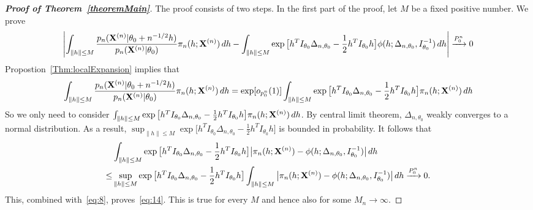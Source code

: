 \documentclass[11pt]{article}
\theoremstyle{plain}
\theoremstyle{definition}
\theoremstyle{remark}
\begin{document}
\begin{appendices}
\begin{proof}[\textbf{Proof of Theorem~\ref{theoremMain}}]
The proof consists of two steps. In the first part of the proof, let  $M$ be a fixed positive number. We prove
\begin{equation}\label{eq:14}
    \left|\int_{\|h\|\leq M} \frac{p_n(\mathbf{X}^{(n)}|\theta_0+n^{-1/2}h)}{p_n(\mathbf{X}^{(n)}|\theta_0)}\pi_n (h;\mathbf{X}^{(n)}) \, dh-\int_{\|h\|\leq M} \exp\big[h^T I_{\theta_0}\Delta_{n,\theta_0}-\frac{1}{2}h^T I_{\theta_0}h\big] \phi(h;\Delta_{n,\theta_0},I_{\theta_0}^{-1})\, dh\right|
 \xrightarrow{P^n_0}0
\end{equation}
Propostion~\ref{Thm:localExpansion} implies that
\begin{equation}\label{eq:8}
    \int_{\|h\|\leq M} \frac{p_n(\mathbf{X}^{(n)}|\theta_0+n^{-1/2}h)}{p_n(\mathbf{X}^{(n)}|\theta_0)}\pi_n (h;\mathbf{X}^{(n)}) \, dh=
    \exp [o_{p^n_0}(1)]\int_{\|h\|\leq M} \exp\big[h^T I_{\theta_0}\Delta_{n,\theta_0}-\frac{1}{2}h^T I_{\theta_0}h\big]\pi_n (h;\mathbf{X}^{(n)}) \, dh
\end{equation}
    So we only need to consider $\int_{\|h\|\leq M} \exp\big[h^T I_{\theta_0}\Delta_{n,\theta_0}-\frac{1}{2}h^T I_{\theta_0}h\big]\pi_n (h;\mathbf{X}^{(n)}) \, dh$.
    By central limit theorem, $\Delta_{n,\theta_0}$ weakly converges to a normal distribution.
    As a result, $\sup_{\|h\|\leq M}\exp\big[h^T I_{\theta_0}\Delta_{n,\theta_0}-\frac{1}{2}h^T I_{\theta_0}h\big]$ is bounded in probability.
    It follows that
\begin{equation*}
\begin{aligned}
    &\int_{\|h\|\leq M} \exp\big[h^T I_{\theta_0}\Delta_{n,\theta_0}-\frac{1}{2}h^T I_{\theta_0}h\big] \big|\pi_n (h;\mathbf{X}^{(n)})-\phi(h;\Delta_{n,\theta_0},I_{\theta_0}^{-1})\big|\, dh
\\
    \leq& \sup_{\|h\|\leq M}\exp\big[h^T I_{\theta_0}\Delta_{n,\theta_0}-\frac{1}{2}h^T I_{\theta_0}h\big] 
    \int_{\|h\|\leq M}
    \big|\pi_n (h;\mathbf{X}^{(n)})-\phi(h;\Delta_{n,\theta_0},I_{\theta_0}^{-1})\big|\, dh
    \xrightarrow{P^n_0}0.
\end{aligned}
\end{equation*}
This, combined with~\eqref{eq:8}, proves~\eqref{eq:14}. 
This is true for every $M$ and hence also for some $M_n\to \infty$.


\end{proof}
\end{appendices}
\end{document}
